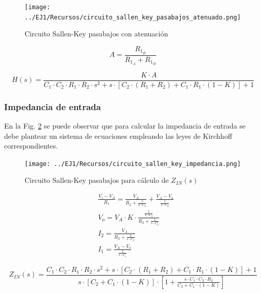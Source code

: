 \begin{figure}[H]
    \centering
    \texttt{[image: ../EJ1/Recursos/circuito\_sallen\_key\_pasabajos\_atenuado.png]}
    \caption{Circuito Sallen-Key pasabajos con atenuaci\'on}
    \label{fig:sallen_key_pasabajos_atenuado}
\end{figure}

\begin{equation}
    A = \frac{R_{1_B}}{R_{1_A} + R_{1_B}}
\end{equation}

\begin{equation}
    H(s) = \frac{K \cdot A}{C_1 \cdot C_2 \cdot R_1 \cdot R_2 \cdot s^{2} + s \cdot \left[ C_2 \cdot (R_1 + R_2) + C_1 \cdot R_1 \cdot (1 - K) \right] + 1}
    \label{eq:sallen_key_h_atenuada}
\end{equation}

\subsubsection{Impedancia de entrada}
En la Fig. \ref{fig:circuito_sallen_key_impedancia_entrada_ideal} se puede observar que para calcular la impedancia de entrada se debe plantear un sistema de ecuaciones empleando 
las leyes de Kirchhoff correspondientes.

\begin{figure}[H]
    \centering
    \texttt{[image: ../EJ1/Recursos/circuito\_sallen\_key\_impedancia.png]}
    \caption{Circuito Sallen-Key pasabajos para c\'alculo de $Z_{IN}(s)$}
    \label{fig:circuito_sallen_key_impedancia_entrada_ideal}
\end{figure}

\begin{align*}
    & \frac{V_i - V_A}{R_1} = \frac{V_A}{R_2 + \frac{1}{s \cdot C_2}} + \frac{V_A - V_o}{\frac{1}{s \cdot C_2}} \\
    & V_o = V_A \cdot K \cdot \frac{\frac{1}{s \cdot C_2}}{R_2 + \frac{1}{s \cdot C_2}} \\
    & I_2 = \frac{V_A}{R_2 + \frac{1}{s \cdot C_2}} \\
    & I_1 = \frac{V_A - V_o}{\frac{1}{s \cdot C_1}}
\end{align*}

\begin{equation}
    Z_{IN}(s) = \frac{C_1 \cdot C_2 \cdot R_1 \cdot R_2 \cdot s^{2} + s \cdot \left[ C_2 \cdot (R_1 + R_2) + C_1 \cdot R_1 \cdot (1 - K) \right] + 1}{s \cdot \left[C_2 + C_1 \cdot (1 - K) \right] \cdot \left[ 1 + \frac{s \cdot C_1 \cdot C_2 \cdot R_2}{C_2 + C_1 \cdot (1 - K)} \right]}
    \label{eq:sallen_key_impedancia_entrada_ideal}
\end{equation}

